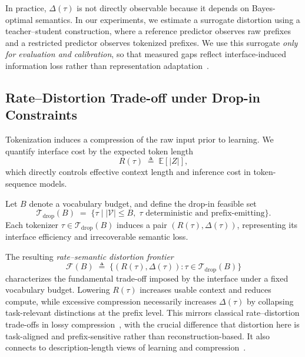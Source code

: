 In practice, $\Delta(\tau)$ is not directly observable because it depends on Bayes-optimal semantics.
In our experiments, we estimate a surrogate distortion using a teacher--student construction, where a reference predictor observes raw prefixes and a restricted predictor observes tokenized prefixes.
We use this surrogate \emph{only for evaluation and calibration}, so that measured gaps reflect interface-induced information loss rather than representation adaptation~\cite{hinton2015distilling}.

\subsection{Rate--Distortion Trade-off under Drop-in Constraints}
\label{sec:rate_distortion}

Tokenization induces a compression of the raw input prior to learning.
We quantify interface cost by the expected token length
\begin{equation}
R(\tau) \;\triangleq\; \mathbb{E}[|Z|],
\label{eq:rate}
\end{equation}
which directly controls effective context length and inference cost in token-sequence models.

Let $B$ denote a vocabulary budget, and define the drop-in feasible set
\begin{equation}
\mathcal{T}_{\mathrm{drop}}(B)
\;=\;
\big\{
\tau \;\big|\;
|\mathcal{V}| \le B,\;
\tau \text{ deterministic and prefix-emitting}
\big\}.
\label{eq:feasible}
\end{equation}
Each tokenizer $\tau \in \mathcal{T}_{\mathrm{drop}}(B)$ induces a pair $(R(\tau), \Delta(\tau))$, representing its interface efficiency and irrecoverable semantic loss.

The resulting \emph{rate--semantic distortion frontier}
\begin{equation}
\mathcal{F}(B)
\;\triangleq\;
\big\{
(R(\tau), \Delta(\tau)) :
\tau \in \mathcal{T}_{\mathrm{drop}}(B)
\big\}
\label{eq:frontier}
\end{equation}
characterizes the fundamental trade-off imposed by the interface under a fixed vocabulary budget.
Lowering $R(\tau)$ increases usable context and reduces compute, while excessive compression necessarily increases $\Delta(\tau)$ by collapsing task-relevant distinctions at the prefix level.
This mirrors classical rate--distortion trade-offs in lossy compression~\cite{shannon1948mathematical,cover1999elements}, with the crucial difference that distortion here is task-aligned and prefix-sensitive rather than reconstruction-based.
It also connects to description-length views of learning and compression~\cite{rissanen1978modeling}.

